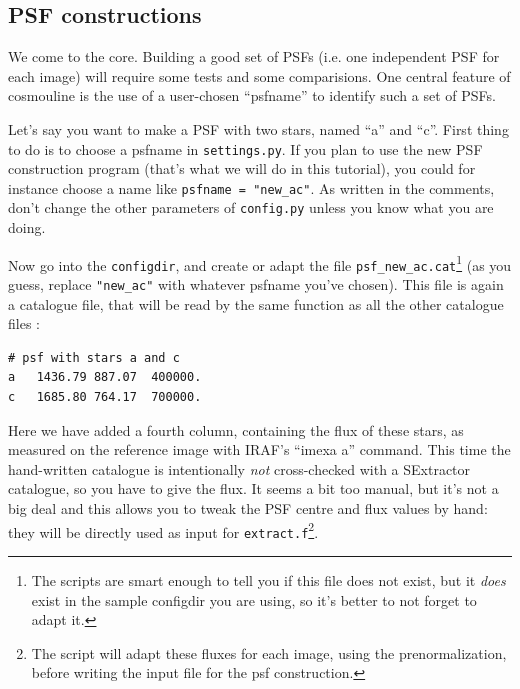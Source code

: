 % 


\subsection{PSF constructions}


We come to the core. Building a good set of PSFs (i.e. one independent PSF for each image) will require some tests and some comparisions. One central feature of cosmouline is the use of a user-chosen ``psfname'' to identify such a set of PSFs. 


Let's say you want to make a PSF with two stars, named ``a'' and ``c''. First thing to do is to choose a psfname in \verb+settings.py+. If you plan to use the new PSF construction program (that's what we will do in this tutorial), you could for instance choose a name like \verb+psfname = "new_ac"+. As written in the comments, don't change the other parameters of \verb+config.py+ unless you know what you are doing.

Now go into the \verb+configdir+, and create or adapt the file \verb+psf_new_ac.cat+\footnote{The scripts are smart enough to tell you if this file does not exist, but it \emph{does} exist in the sample configdir you are using, so it's better to not forget to adapt it.} (as you guess, replace \verb+"new_ac"+ with whatever psfname you've chosen). This file is again a catalogue file, that will be read by the same function as all the other catalogue files :

\begin{Verbatim}[fontsize=\relsize{-2}]
# psf with stars a and c
a	1436.79	887.07	400000.
c	1685.80	764.17	700000.
\end{Verbatim}

Here we have added a fourth column, containing the flux of these stars, as measured on the reference image with IRAF's ``imexa a'' command. This time the hand-written catalogue is intentionally \emph{not} cross-checked with a SExtractor catalogue, so you have to give the flux. It seems a bit too manual, but it's not a big deal and this allows you to tweak the PSF centre and flux values by hand: they will be directly used as input for \verb+extract.f+\footnote{The script will adapt these fluxes for each image, using the prenormalization, before writing the input file for the psf construction.}.


